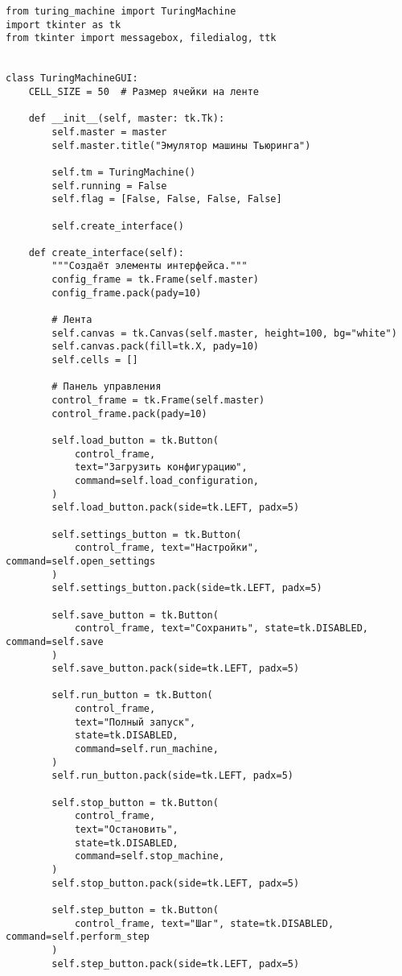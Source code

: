 \begin{lstlisting}
from turing_machine import TuringMachine
import tkinter as tk
from tkinter import messagebox, filedialog, ttk


class TuringMachineGUI:
    CELL_SIZE = 50  # Размер ячейки на ленте

    def __init__(self, master: tk.Tk):
        self.master = master
        self.master.title("Эмулятор машины Тьюринга")

        self.tm = TuringMachine()
        self.running = False
        self.flag = [False, False, False, False]

        self.create_interface()

    def create_interface(self):
        """Создаёт элементы интерфейса."""
        config_frame = tk.Frame(self.master)
        config_frame.pack(pady=10)

        # Лента
        self.canvas = tk.Canvas(self.master, height=100, bg="white")
        self.canvas.pack(fill=tk.X, pady=10)
        self.cells = []

        # Панель управления
        control_frame = tk.Frame(self.master)
        control_frame.pack(pady=10)

        self.load_button = tk.Button(
            control_frame,
            text="Загрузить конфигурацию",
            command=self.load_configuration,
        )
        self.load_button.pack(side=tk.LEFT, padx=5)

        self.settings_button = tk.Button(
            control_frame, text="Настройки", command=self.open_settings
        )
        self.settings_button.pack(side=tk.LEFT, padx=5)

        self.save_button = tk.Button(
            control_frame, text="Сохранить", state=tk.DISABLED, command=self.save
        )
        self.save_button.pack(side=tk.LEFT, padx=5)

        self.run_button = tk.Button(
            control_frame,
            text="Полный запуск",
            state=tk.DISABLED,
            command=self.run_machine,
        )
        self.run_button.pack(side=tk.LEFT, padx=5)

        self.stop_button = tk.Button(
            control_frame,
            text="Остановить",
            state=tk.DISABLED,
            command=self.stop_machine,
        )
        self.stop_button.pack(side=tk.LEFT, padx=5)

        self.step_button = tk.Button(
            control_frame, text="Шаг", state=tk.DISABLED, command=self.perform_step
        )
        self.step_button.pack(side=tk.LEFT, padx=5)


\end{lstlisting}
